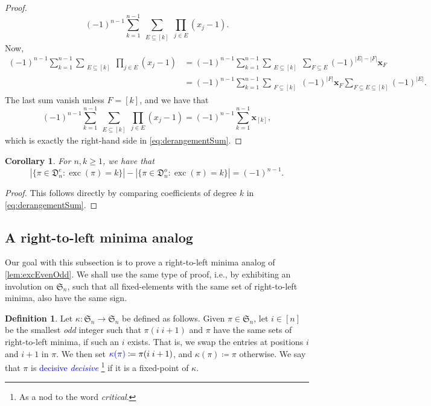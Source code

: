 \documentclass[reqno]{amsart}
\newtheorem{corollary}[theorem]{Corollary}
\theoremstyle{definition}
\newtheorem{definition}[theorem]{Definition}
\newcommand{\defin}[1]{%
\relax\ifmmode%
\textcolor{blue}{#1}%
\else\textcolor{blue}{\emph{#1}}%
\fi%
}
\newcommand{\xvec}{\mathbf{x}}
\newcommand{\symS}{\mathfrak{S}}
\newcommand{\dArr}{\mathfrak{D}}
\DeclareMathOperator{\exc}{exc}
\begin{document}
\begin{proof}
 \[
(-1)^{n-1}
 \sum_{k=1}^{n-1} 
 \sum_{\substack{E \subseteq [k]}} 
 \prod_{ j \in E } (x_j-1).
\]
Now,
\begin{align*}
(-1)^{n-1}
\sum_{k=1}^{n-1} 
\sum_{\substack{E \subseteq [k]}} 
\prod_{ j \in E } (x_j-1)
&=
(-1)^{n-1}
\sum_{k=1}^{n-1} 
\sum_{\substack{E \subseteq [k]}} 
\sum_{F \subseteq E} (-1)^{|E|-|F|}\xvec_F \\
&=
(-1)^{n-1}
\sum_{k=1}^{n-1} 
\sum_{\substack{F \subseteq [k]}} 
(-1)^{|F|}\xvec_F
\sum_{F \subseteq E \subseteq [k]} (-1)^{|E|}.
\end{align*}
The last sum vanish unless $F=[k]$, and we have that 
\begin{equation}
(-1)^{n-1}
\sum_{k=1}^{n-1} 
\sum_{\substack{E \subseteq [k]}} 
\prod_{ j \in E } (x_j-1)
=
(-1)^{n-1}\sum_{k=1}^{n-1} \xvec_{[k]},
\end{equation}
which is exactly the right-hand side in \eqref{eq:derangementSum}.
\end{proof}


\begin{corollary}
For $n,k \geq 1$, we have that
\[
|\{ \pi \in \dArr^e_n : \exc(\pi) = k \}|-|\{ \pi \in \dArr^o_n : \exc(\pi) = k \}| = (-1)^{n-1}.
\]
\end{corollary}
\begin{proof}
 This follows directly by comparing
 coefficients of degree $k$ in \eqref{eq:derangementSum}.
\end{proof}




\subsection{A right-to-left minima analog}

Our goal with this subsection is to prove 
a right-to-left minima analog of \cref{lem:excEvenOdd}.
We shall use the same type of proof, i.e., by exhibiting an involution on $\symS_n$,
such that all fixed-elements with the same set of right-to-left minima,
also have the same sign.

\begin{definition}
Let $\kappa : \symS_n \to \symS_n$ be defined as follows.
Given $\pi \in \symS_n$, let $i \in [n]$ be the smallest \emph{odd} integer 
such that $\pi (i \; i+1)$ and $\pi$ have the same sets of right-to-left minima,
if such an $i$ exists. That is, we swap the entries at positions $i$ and $i+1$ in $\pi$.
%
We then set $\defin{\kappa(\pi)} \coloneqq \pi (i \; i+1)$,
and $\kappa(\pi) \coloneqq \pi$ otherwise.
We say that $\pi$ is \defin{decisive}\footnote{As a nod to the word \emph{critical}.}
if it is a fixed-point of $\kappa$.
\end{definition}
\end{document}
